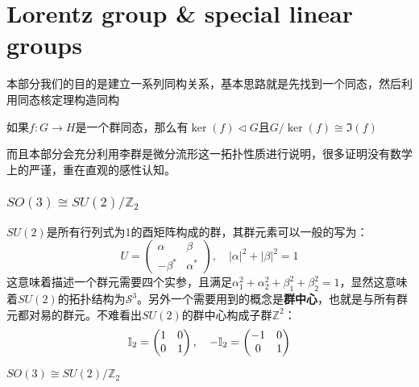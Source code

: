 \part{Lorentz group \& special linear groups}
\setcounter{theorem}{0}
\setcounter{definition}{0}
\setcounter{lemma}{0}
\setcounter{sidenote}{1}

本部分我们的目的是建立一系列同构关系，基本思路就是先找到一个同态，然后利用同态核定理构造同构
\begin{theorem}[同态核定理]
	如果$f:G\to H$是一个群同态，那么有$\ker(f)\lhd G$且$G/\ker(f)\cong\Im(f)$
\end{theorem}
而且本部分会充分利用李群是微分流形这一拓扑性质进行说明，很多证明没有数学上的严谨，重在直观的感性认知。
\section{$SO(3)\cong SU(2)/\mathbb{Z}_2$}
$SU(2)$是所有行列式为1的酉矩阵构成的群，其群元素可以一般的写为：
\[
U=
\begin{pmatrix}
	\alpha & \beta\\
	-\beta^* &\alpha^*
\end{pmatrix},\quad |\alpha|^2+|\beta|^2=1
\]
这意味着描述一个群元需要四个实参，且满足$\alpha_1^2+\alpha_2^2+\beta_1^2+\beta_2^2=1$，显然这意味着$SU(2)$的拓扑结构为$\mathcal{S}^3$。另外一个需要用到的概念是\textbf{群中心}，也就是与所有群元都对易的群元。不难看出$SU(2)$的群中心构成子群$\mathbb{Z}^2$：
\[
\mathbb{I}_2=\begin{pmatrix}
	1 & 0\\
	0 &1
\end{pmatrix},\quad
-\mathbb{I}_2=\begin{pmatrix}
	-1 &0\\
	0 &\-1
\end{pmatrix}
\]
\begin{theorem}
$
		SO(3)\cong SU(2)/\mathbb{Z}_2
$
\end{theorem}

